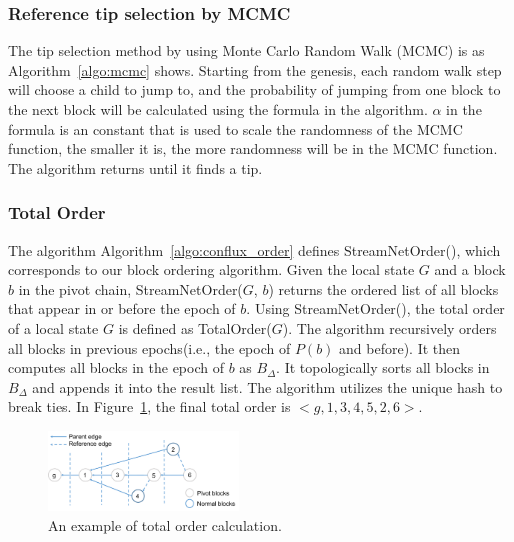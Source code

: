 

\subsubsection{Reference tip selection by MCMC} 

The tip selection method by using Monte Carlo Random Walk (MCMC) is as Algorithm~\ref{algo:mcmc} shows.
Starting from the genesis, each random walk step will choose a child to jump to,
and the probability of jumping from one block to the next block will be calculated using the formula in the algorithm.
$\alpha$ in the formula is an constant that is used to scale the randomness of the MCMC function, the smaller it is, the more randomness will be in the MCMC function.
The algorithm returns until it finds a tip.

\subsubsection{Total Order} 
The algorithm Algorithm~\ref{algo:conflux_order} defines StreamNetOrder(), 
which corresponds to our block ordering algorithm. 
Given the local state $G$ and a block $b$ in the pivot chain, 
StreamNetOrder($G$, $b$) returns the ordered list of all blocks that appear in or before the epoch of $b$. 
Using StreamNetOrder(), the total order of a local state $G$ is defined as TotalOrder($G$). 
The algorithm recursively orders all blocks in previous epochs(i.e., the epoch of $P(b)$ and before). 
It then computes all blocks in the epoch of $b$ as $B_\Delta$. 
It topologically sorts all blocks in $B_\Delta$ and appends it into the result list. 
The algorithm utilizes the unique hash to break ties. 
In Figure~\ref{total_order}, the final total order is $<g, 1, 3, 4, 5, 2, 6>$.



\begin{figure}[!ht]
\begin{center}
\includegraphics[width=0.45\textwidth]{figures/total_order.pdf}
    \caption{
        An example of total order calculation.
     }
\label{total_order}
\end{center}
\end{figure}

